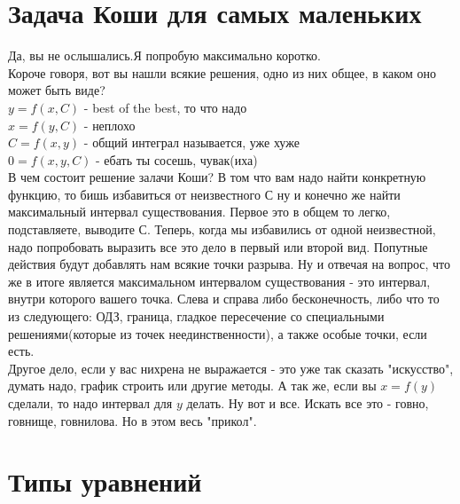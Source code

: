 \documentclass[12pt]{article}
\begin{document}
\section{Задача Коши для самых маленьких}
Да, вы не ослышались.Я попробую максимально коротко. \\
Короче говоря, вот вы нашли всякие решения, одно из них общее, в каком оно может быть виде? \\
$ y = f(x, C)$ - best of the best, то что надо \\
$ x = f(y, C)$ - неплохо \\
$ C = f(x, y)$ - общий интеграл называется, уже хуже \\
$ 0 = f(x, y, C)$ - ебать ты сосешь, чувак(иха) \\
В чем состоит решение залачи Коши? В том что вам надо найти конкретную функцию, то бишь избавиться от неизвестного $С$ ну и конечно же найти максимальный интервал существования. Первое это в общем то легко, подставляете, выводите С. Теперь, когда мы избавились от одной неизвестной, надо попробовать выразить все это дело в первый или второй вид. Попутные действия будут добавлять нам всякие точки разрыва. Ну и отвечая на вопрос, что же в итоге является максимальном интервалом существования - это интервал, внутри которого вашего точка. Слева и справа либо бесконечность, либо что то из следующего: ОДЗ, граница, гладкое пересечение со специальными решениями(которые из точек неединственности), а также особые точки, если есть.\\
Другое дело, если у вас нихрена не выражается - это уже так сказать "искусство", думать надо, график строить или другие методы. А так же, если вы $x = f(y)$ сделали, то надо интервал для $y$ делать. 
Ну вот и все. Искать все это - говно, говнище, говнилова. Но в этом весь "прикол".


\section{Типы уравнений}
\end{document}
